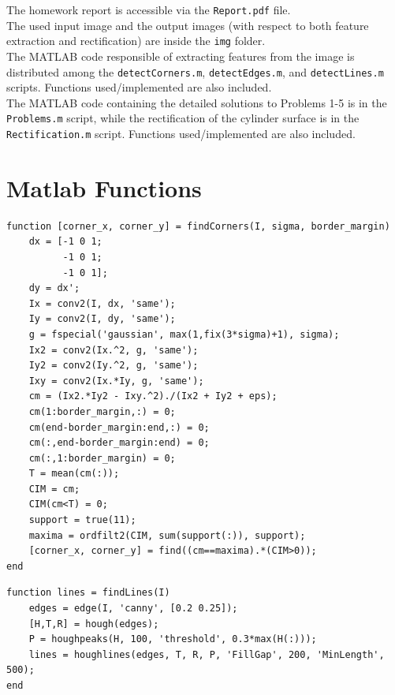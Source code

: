 \documentclass[12pt,a4paper]{article}
\begin{document}
 \vspace{1.5cm}

 The homework report is accessible via the \verb|Report.pdf| file.\\

 The used input image and the output images (with respect to both feature extraction and rectification) are inside the \verb|img| folder.\\

 The MATLAB code responsible of extracting features from the image is distributed among the \verb|detectCorners.m|, \verb|detectEdges.m|, and \verb|detectLines.m| scripts. Functions used/implemented are also included.\\

 The MATLAB code containing the detailed solutions to Problems 1-5 is in the \verb|Problems.m| script, while the rectification of the cylinder surface is in the \verb|Rectification.m| script. Functions used/implemented are also included.

\pagebreak

\section*{Matlab Functions}

\begin{verbatim}
function [corner_x, corner_y] = findCorners(I, sigma, border_margin)
    dx = [-1 0 1; 
          -1 0 1; 
          -1 0 1];
    dy = dx';
    Ix = conv2(I, dx, 'same');
    Iy = conv2(I, dy, 'same');
    g = fspecial('gaussian', max(1,fix(3*sigma)+1), sigma);
    Ix2 = conv2(Ix.^2, g, 'same');
    Iy2 = conv2(Iy.^2, g, 'same');
    Ixy = conv2(Ix.*Iy, g, 'same');
    cm = (Ix2.*Iy2 - Ixy.^2)./(Ix2 + Iy2 + eps);
    cm(1:border_margin,:) = 0;
    cm(end-border_margin:end,:) = 0;
    cm(:,end-border_margin:end) = 0;
    cm(:,1:border_margin) = 0;
    T = mean(cm(:));
    CIM = cm;
    CIM(cm<T) = 0;
    support = true(11);
    maxima = ordfilt2(CIM, sum(support(:)), support);
    [corner_x, corner_y] = find((cm==maxima).*(CIM>0));
end
\end{verbatim}

\begin{verbatim}
function lines = findLines(I)
    edges = edge(I, 'canny', [0.2 0.25]);
    [H,T,R] = hough(edges);
    P = houghpeaks(H, 100, 'threshold', 0.3*max(H(:)));
    lines = houghlines(edges, T, R, P, 'FillGap', 200, 'MinLength', 500);
end
\end{verbatim}
\end{document}
